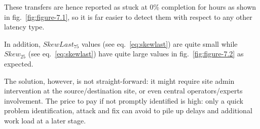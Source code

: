 These transfers are hence reported as stuck at 0\% completion for
hours as shown in fig.~\ref{fig:figure-7.1}, so it is far easier
to detect them with respect to any other latency type.

In addition, $SkewLast_{75}$ values (see eq.~\ref{eq:skewlast}) are
quite small while $Skew_{25}$ (see eq.~\ref{eq:skewlast}) have quite
large values in fig.~\ref{fig:figure-7.2} as expected.



The solution, however, is not straight-forward: it might require site
admin intervention at the source/destination site, or even central
operators/experts involvement. The price to pay if not promptly
identified is high: only a quick problem identification, attack and
fix can avoid to pile up delays and additional work load at a later
stage.
